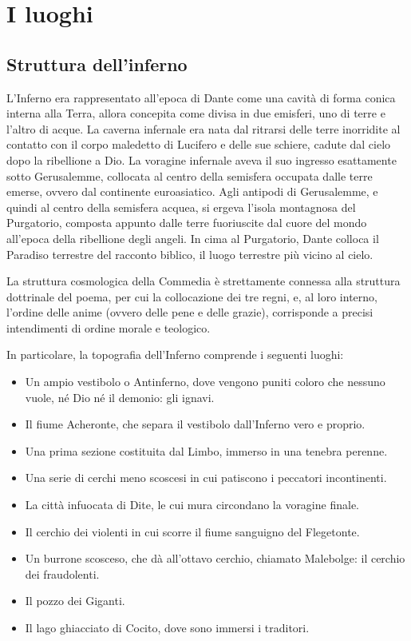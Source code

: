 \documentclass[10pt,a4paper]{article}
\begin{document}
 	\section{I luoghi}
 	
 	\subsection{Struttura dell'inferno}
 	
 	L'Inferno era rappresentato all'epoca di Dante come una cavità di forma conica interna alla Terra, allora concepita come divisa in due emisferi, uno di terre e l'altro di acque. La caverna infernale era nata dal ritrarsi delle terre inorridite al contatto con il corpo maledetto di Lucifero e delle sue schiere, cadute dal cielo dopo la ribellione a Dio. La voragine infernale aveva il suo ingresso esattamente sotto Gerusalemme, collocata al centro della semisfera occupata dalle terre emerse, ovvero dal continente euroasiatico. Agli antipodi di Gerusalemme, e quindi al centro della semisfera acquea, si ergeva l'isola montagnosa del Purgatorio, composta appunto dalle terre fuoriuscite dal cuore del mondo all'epoca della ribellione degli angeli. In cima al Purgatorio, Dante colloca il Paradiso terrestre del racconto biblico, il luogo terrestre più vicino al cielo.
 	
 	La struttura cosmologica della Commedia è strettamente connessa alla struttura dottrinale del poema, per cui la collocazione dei tre regni, e, al loro interno, l'ordine delle anime (ovvero delle pene e delle grazie), corrisponde a precisi intendimenti di ordine morale e teologico.
 	
 	In particolare, la topografia dell'Inferno comprende i seguenti luoghi:
 	\begin{itemize}
 \item	Un ampio vestibolo o Antinferno, dove vengono puniti coloro che nessuno vuole, né Dio né il demonio: gli ignavi.
 \item	Il fiume Acheronte, che separa il vestibolo dall'Inferno vero e proprio.
 \item	Una prima sezione costituita dal Limbo, immerso in una tenebra perenne.
 \item	Una serie di cerchi meno scoscesi in cui patiscono i peccatori incontinenti.
 \item	La città infuocata di Dite, le cui mura circondano la voragine finale.
 \item	Il cerchio dei violenti in cui scorre il fiume sanguigno del Flegetonte.
 \item	Un burrone scosceso, che dà all'ottavo cerchio, chiamato Malebolge: il cerchio dei fraudolenti.
 \item	Il pozzo dei Giganti.
 \item	Il lago ghiacciato di Cocito, dove sono immersi i traditori.
 \end{itemize}
 	
\end{document}
